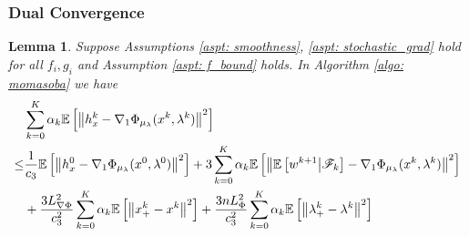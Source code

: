 \documentclass[10pt]{article}
\newtheorem{lemma}{Lemma}[section]
\theoremstyle{remark}
\def\setF{\mathscr{F}} %
\newcommand{\E}{\mathbb{E}}
\newcommand{\norm}[1]{\left\|#1\right\|}
\begin{document}
\subsubsection{Dual Convergence}
\begin{lemma}\label{lem: x_dual}
    Suppose Assumptions \ref{aspt: smoothness}, \ref{aspt: stochastic_grad} hold for all $f_i, g_i$ and Assumption \ref{aspt: f_bound} holds. In Algorithm \ref{algo: momasoba} we have
    \begin{align}
        &\sum_{k=0}^{K}\alpha_k\E\left[\norm{h_x^k - \nabla_1\Phi_{\mu_{\lambda}}(x^k, \lambda^k)}^2\right] \notag\\
        \leq &\frac{1}{c_3}\E\left[\norm{h_x^0 - \nabla_1\Phi_{\mu_{\lambda}}(x^0, \lambda^0)}^2\right] + 3\sum_{k=0}^{K}\alpha_k\E\left[\norm{\E\left[w^{k+1}\middle|\setF_k\right] - \nabla_1\Phi_{\mu_{\lambda}}(x^k, \lambda^k)}^2\right] \notag\\
        & + \frac{3L_{\nabla \Phi}^2}{c_3^2}\sum_{k=0}^{K}\alpha_k\E\left[\norm{x_+^k - x^k}^2\right] +  \frac{3nL_{\Phi}^2}{c_3^2}\sum_{k=0}^{K}\alpha_k\E\left[\norm{\lambda_+^k - \lambda^k}^2\right] \notag\\

\end{align}
\end{lemma}
\end{document}
